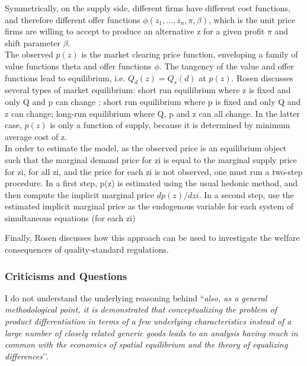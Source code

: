 \documentclass[12pt, final]{article}
\begin{document}
Symmetrically, on the supply side, different firms have different cost functions, and therefore different offer functions $\phi(z_1, …, z_n, \pi, \beta)$, which is the unit price firms are willing to accept to produce an alternative z for a given profit $\pi$ and shift parameter $\beta$.
\\

The observed $p(z)$ is the market clearing price function, enveloping a family of value functions theta and offer functions $\phi$. The tangency of the value and offer functions lead to equilibrium, i.e. $Q_d(z) = Q_s(d)$ at $p(z)$.
Rosen discusses several types of market equilibrium: short run equilibrium where z is fixed and only Q and p can change ; short run equilibrium where p is fixed and only Q and z can change; long-run equilibrium where Q, p and z can all change. In the latter case, $p(z)$ is only a function of supply, because it is determined by minimum average cost of z.
\\

In order to estimate the model, as the observed price is an equilibrium object such that the marginal demand price for zi is equal to the marginal supply price for zi, for all zi, and the price for each zi is not observed, one must run a two-step procedure. In a first step, p(z) is estimated using the usual hedonic method, and then compute the implicit marginal price $d p(z) / d zi$. In a second step, use the estimated implicit marginal price as the endogenous variable for each system of simultaneous equations (for each zi)

Finally, Rosen discusses how this approach can be used to investigate the welfare consequences of quality-standard regulations.





\subsubsection*{Criticisms and Questions} %
\label{ssub:criticisms_and_questions}



I do not understand the underlying reasoning behind ``\textit{also, as a general methodological point, it is demonstrated that conceptualizing the problem of product differentiation in terms of a few underlying characteristics instead of a large number of closely related generic goods leads to an analysis having much in common with the economics of spatial equilibrium and the theory of equalizing differences}’’.
\\
\end{document}
